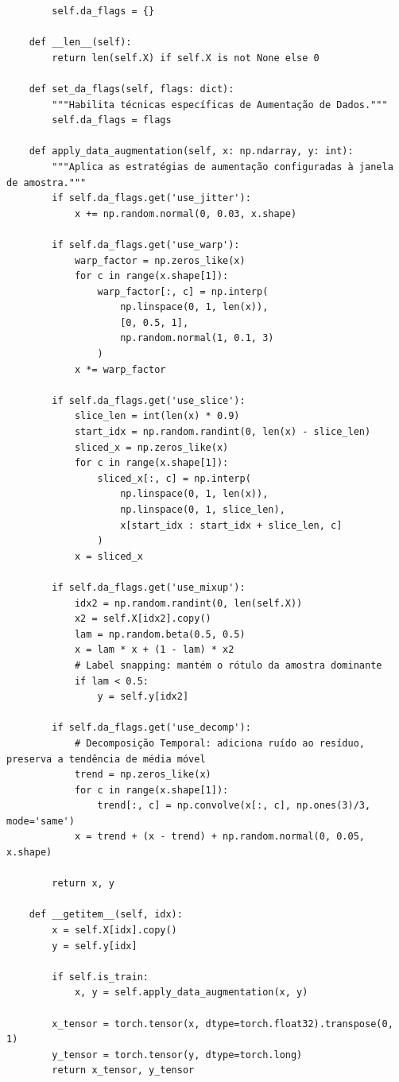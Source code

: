 \documentclass{article}
\begin{document}
\begin{verbatim}
        self.da_flags = {}
            
    def __len__(self):
        return len(self.X) if self.X is not None else 0
        
    def set_da_flags(self, flags: dict):
        """Habilita técnicas específicas de Aumentação de Dados."""
        self.da_flags = flags

    def apply_data_augmentation(self, x: np.ndarray, y: int):
        """Aplica as estratégias de aumentação configuradas à janela de amostra."""
        if self.da_flags.get('use_jitter'):
            x += np.random.normal(0, 0.03, x.shape)
            
        if self.da_flags.get('use_warp'):
            warp_factor = np.zeros_like(x)
            for c in range(x.shape[1]):
                warp_factor[:, c] = np.interp(
                    np.linspace(0, 1, len(x)), 
                    [0, 0.5, 1], 
                    np.random.normal(1, 0.1, 3)
                )
            x *= warp_factor
            
        if self.da_flags.get('use_slice'):
            slice_len = int(len(x) * 0.9)
            start_idx = np.random.randint(0, len(x) - slice_len)
            sliced_x = np.zeros_like(x)
            for c in range(x.shape[1]):
                sliced_x[:, c] = np.interp(
                    np.linspace(0, 1, len(x)), 
                    np.linspace(0, 1, slice_len), 
                    x[start_idx : start_idx + slice_len, c]
                )
            x = sliced_x
            
        if self.da_flags.get('use_mixup'):
            idx2 = np.random.randint(0, len(self.X))
            x2 = self.X[idx2].copy()
            lam = np.random.beta(0.5, 0.5)
            x = lam * x + (1 - lam) * x2
            # Label snapping: mantém o rótulo da amostra dominante
            if lam < 0.5: 
                y = self.y[idx2] 
                
        if self.da_flags.get('use_decomp'):
            # Decomposição Temporal: adiciona ruído ao resíduo, preserva a tendência de média móvel
            trend = np.zeros_like(x)
            for c in range(x.shape[1]):
                trend[:, c] = np.convolve(x[:, c], np.ones(3)/3, mode='same')
            x = trend + (x - trend) + np.random.normal(0, 0.05, x.shape)
            
        return x, y

    def __getitem__(self, idx):
        x = self.X[idx].copy()
        y = self.y[idx]
        
        if self.is_train:
            x, y = self.apply_data_augmentation(x, y)
                
        x_tensor = torch.tensor(x, dtype=torch.float32).transpose(0, 1)
        y_tensor = torch.tensor(y, dtype=torch.long)
        return x_tensor, y_tensor
\end{verbatim}
\end{document}
